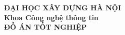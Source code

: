 {\textbf{\large{ĐẠI HỌC XÂY DỰNG HÀ NỘI}}}\\[4cm]
{\textbf{\large{Khoa Công nghệ thông tin}}}\\[4cm]
{\textbf{\huge{ ĐỒ ÁN TỐT NGHIỆP}}}\\[1cm]

\newpage